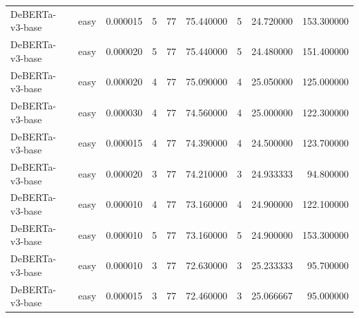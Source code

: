 \begin{tabular}{llrrrrrrr}
DeBERTa-v3-base & easy & 0.000015 & 5 & 77 & 75.440000 & 5 & 24.720000 & 153.300000 \\
DeBERTa-v3-base & easy & 0.000020 & 5 & 77 & 75.440000 & 5 & 24.480000 & 151.400000 \\
DeBERTa-v3-base & easy & 0.000020 & 4 & 77 & 75.090000 & 4 & 25.050000 & 125.000000 \\
DeBERTa-v3-base & easy & 0.000030 & 4 & 77 & 74.560000 & 4 & 25.000000 & 122.300000 \\
DeBERTa-v3-base & easy & 0.000015 & 4 & 77 & 74.390000 & 4 & 24.500000 & 123.700000 \\
DeBERTa-v3-base & easy & 0.000020 & 3 & 77 & 74.210000 & 3 & 24.933333 & 94.800000 \\
DeBERTa-v3-base & easy & 0.000010 & 4 & 77 & 73.160000 & 4 & 24.900000 & 122.100000 \\
DeBERTa-v3-base & easy & 0.000010 & 5 & 77 & 73.160000 & 5 & 24.900000 & 153.300000 \\
DeBERTa-v3-base & easy & 0.000010 & 3 & 77 & 72.630000 & 3 & 25.233333 & 95.700000 \\
DeBERTa-v3-base & easy & 0.000015 & 3 & 77 & 72.460000 & 3 & 25.066667 & 95.000000 \\
\bottomrule
\end{tabular}

